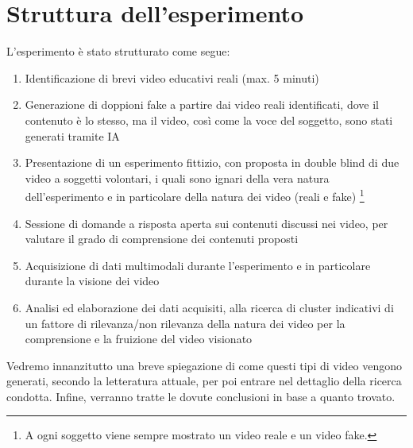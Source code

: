 \section*{Struttura dell'esperimento}

L'esperimento è stato strutturato come segue:
\begin{enumerate}
\item Identificazione di brevi video educativi reali (max. 5 minuti)
\item Generazione di doppioni fake a partire dai video reali identificati, dove il contenuto è lo stesso, ma il video, così come la voce del soggetto, sono stati generati tramite IA
\item Presentazione di un esperimento fittizio, con proposta in double blind di due video a soggetti volontari, i quali sono ignari della vera natura dell'esperimento e in particolare della natura dei video (reali e fake) \footnote{A ogni soggetto viene sempre mostrato un video reale e un video fake.}
\item Sessione di domande a risposta aperta sui contenuti discussi nei video, per valutare il grado di comprensione dei contenuti proposti
\item Acquisizione di dati multimodali durante l'esperimento e in particolare durante la visione dei video
\item Analisi ed elaborazione dei dati acquisiti, alla ricerca di cluster indicativi di un fattore di rilevanza/non rilevanza della natura dei video per la comprensione e la fruizione del video visionato
\end{enumerate}

Vedremo innanzitutto una breve spiegazione di come questi tipi di video vengono generati, secondo la letteratura attuale, per poi entrare nel dettaglio della ricerca condotta. Infine, verranno tratte le dovute conclusioni in base a quanto trovato.

\clearpage